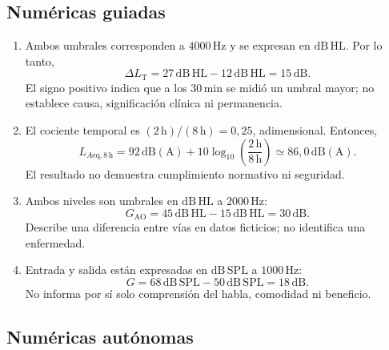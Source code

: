 \subsection*{Numéricas guiadas}

\begin{enumerate}[label=\textbf{NG\arabic*.},leftmargin=*]
    \item
    Ambos umbrales corresponden a \(4000\,\mathrm{Hz}\) y se expresan en
    \(\mathrm{dB\,HL}\). Por lo tanto,
    \[
        \Delta L_{\mathrm{T}}
        =
        27\,\mathrm{dB\,HL}-12\,\mathrm{dB\,HL}
        =
        15\,\mathrm{dB}.
    \]
    El signo positivo indica que a los \(30\,\mathrm{min}\) se midió un umbral
    mayor; no establece causa, significación clínica ni permanencia.

    \item
    El cociente temporal es
    \((2\,\mathrm{h})/(8\,\mathrm{h})=0{,}25\), adimensional. Entonces,
    \[
        L_{A\mathrm{eq},8\,\mathrm{h}}
        =
        92\,\mathrm{dB(A)}
        +10\log_{10}\left(\frac{2\,\mathrm{h}}{8\,\mathrm{h}}\right)
        \simeq 86{,}0\,\mathrm{dB(A)}.
    \]
    El resultado no demuestra cumplimiento normativo ni seguridad.

    \item
    Ambos niveles son umbrales en \(\mathrm{dB\,HL}\) a
    \(2000\,\mathrm{Hz}\):
    \[
        G_{\mathrm{AO}}
        =
        45\,\mathrm{dB\,HL}
        -
        15\,\mathrm{dB\,HL}
        =
        30\,\mathrm{dB}.
    \]
    Describe una diferencia entre vías en datos ficticios; no identifica una
    enfermedad.

    \item
    Entrada y salida están expresadas en \(\mathrm{dB\,SPL}\) a
    \(1000\,\mathrm{Hz}\):
    \[
        G
        =
        68\,\mathrm{dB\,SPL}
        -
        50\,\mathrm{dB\,SPL}
        =
        18\,\mathrm{dB}.
    \]
    No informa por sí solo comprensión del habla, comodidad ni beneficio.
\end{enumerate}

\subsection*{Numéricas autónomas}

